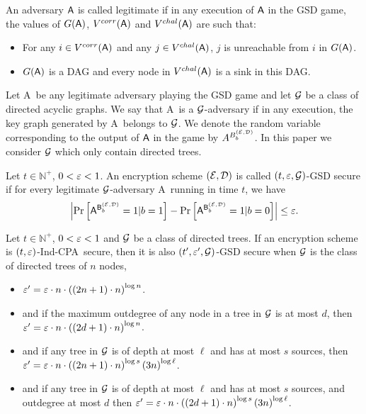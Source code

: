 \documentclass{article}
\newcommand{\tcpa}{$(t,\eps)$-Ind-CPA}
\def\B{{\sf B}}
\def\A{{\sf A}}
\def\E{{\cal E}}
\def\D{{\cal D}}
\newcommand{\NN}{{\mathbb{N}}}
\begin{document}
\begin{definition} An adversary $\A$ is called legitimate if in any execution of $\A$ in the GSD game,
the values of $G(\A)$, $V^{corr}(\A)$ and $V^{chal}(\A)$ are such that:
\begin{itemize}
\item For any $i \in V^{corr}(\A)$ and any $j \in V^{chal}(\A)$, $j$ is unreachable from $i$ in $G(\A)$.
\item $G(\A)$ is a DAG and every node in $V^{chal}(\A)$ is a sink in this DAG.
\end{itemize}
\end{definition}

Let \A~be any legitimate adversary playing the GSD game and let ${\cal G}$ be a class of directed acyclic graphs. We say that \A~is a ${\cal G}$-adversary if in any execution, the key graph generated by \A~belongs to ${\cal G}$. We denote the random variable corresponding to the output
of $\A$ in the game by $A^{B^{(\E,\D)}_b}$. In this paper we consider ${\cal G}$ which only contain directed trees.  

\begin{definition} Let $t \in \NN^+$, $0 < \varepsilon < 1$. An encryption scheme $(\E,\D)$ is called $(t,\varepsilon, {\cal G})$-GSD secure if for every legitimate ${\cal G}$-adversary \A~running in time $t$, we have
$$\abs{\prob{\A^{\B^{(\E,\D)}_b}=1|b=1}-\prob{\A^{\B^{(\E,\D)}_b}=1|b=0}}\leq \eps.$$
\end{definition}

\begin{theorem}\label{thm:main}
Let $t \in \NN^+$, $0 < \varepsilon < 1$ and ${\cal G}$ be a class of directed trees. If an encryption scheme is \tcpa~secure, then it is also $(t',\varepsilon',{\cal G})$-GSD secure when ${\cal G}$ is the class of directed trees of $n$ nodes,

\begin{itemize}
\item$\varepsilon'=\varepsilon \cdot n \cdot \left( (2n+1)\cdot n \right)^{\log n}$.
\item and if the maximum outdegree of any node in a tree in ${\cal G}$ is at most $d$, then $\varepsilon'=\varepsilon \cdot n \cdot \left( (2d+1)\cdot n \right)^{\log n}$.
\item and if any tree in ${\cal G}$ is of depth at most $\ell$ and has at most $s$ sources, then $\varepsilon'=\varepsilon \cdot n \cdot \left( (2n+1)\cdot n \right)^{\log s} \left( 3n \right)^{\log \ell} $.
\item and if any tree in ${\cal G}$ is of depth at most $\ell$ and has at most $s$ sources, and outdegree at most $d$ then $\varepsilon'=\varepsilon \cdot n \cdot \left( (2d+1)\cdot n \right)^{\log s} \left( 3n \right)^{\log \ell} $.

\end{itemize} 
\end{theorem}
\end{document}
